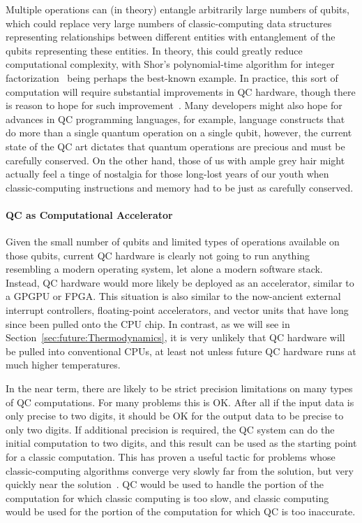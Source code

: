 Multiple  operations can (in theory) entangle arbitrarily
large numbers of qubits, which could replace very large numbers of
classic-computing data structures representing relationships between
different entities with entanglement of the qubits
representing these entities.
In theory, this could greatly reduce computational complexity, with
Shor's polynomial-time algorithm for integer
factorization~\cite{Shor:1997:PAP:264393.264406}
being perhaps the best-known example.
In practice, this sort of computation will require substantial
improvements in QC hardware, though there is reason to hope
for such improvement~\cite{RobertMcConnell2015QC-Entangle3000Atoms}.
Many developers might also hope for advances in QC programming languages,
for example, language constructs that do more than a single quantum
operation on a single qubit, however, the current state of the
QC art dictates that quantum operations are precious and must
be carefully conserved.
On the other hand, those of us with ample grey hair might actually
feel a tinge of nostalgia for those long-lost years of our youth when
classic-computing instructions and memory had to be just as carefully
conserved.

\paragraph{QC as Computational Accelerator}

Given the small number of qubits and limited types of operations available
on those qubits, current QC hardware is clearly not going to run anything
resembling a modern operating system, let alone a modern software stack.
Instead, QC hardware would more likely be deployed as an accelerator,
similar to a GPGPU or FPGA.
This situation is also similar to the now-ancient external interrupt
controllers, floating-point accelerators, and vector units that have
long since been pulled onto the CPU chip.
In contrast, as we will see in Section~\ref{sec:future:Thermodynamics}, 
it is very unlikely that QC hardware will be pulled into conventional
CPUs, at least not unless future QC hardware runs at much higher
temperatures.

In the near term, there are likely to be strict precision limitations
on many types of QC computations.
For many problems this is OK.
After all if the input data is only precise to two digits, it should
be OK for the output data to be precise to only two digits.
If additional precision is required, the QC system can do the
initial computation to two digits, and this result can be used
as the starting point for a classic computation.
This has proven a useful tactic for problems whose classic-computing
algorithms converge very slowly far from the solution, but very
quickly near the solution~\cite{JakubKurzak2007MixedPrecision}.
QC would be used to handle the portion of the computation for which
classic computing is too slow, and classic computing would be used
for the portion of the computation for which QC is too inaccurate.

